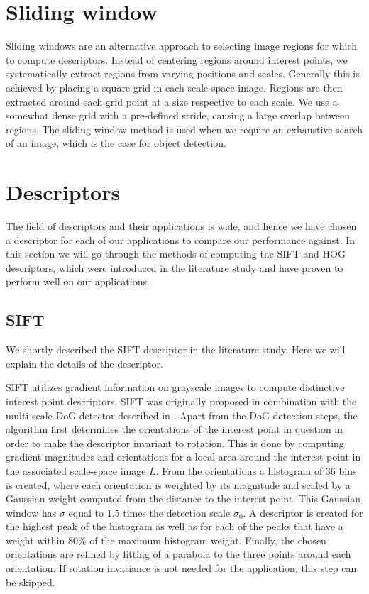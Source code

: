\documentclass[thesis.tex]{subfiles}
\begin{document}
\section{Sliding window}
\label{sec:slidingWindow}
%
Sliding windows are an alternative approach to selecting image regions for which to compute descriptors. Instead of centering regions around interest points, we systematically extract regions from varying positions and scales. Generally this is achieved by placing a square grid in each scale-space image. Regions are then extracted around each grid point at a size respective to each scale. We use a somewhat dense grid with a pre-defined stride, causing a large overlap between regions. The sliding window method is used when we require an exhaustive search of an image, which is the case for object detection.

\section{Descriptors}

The field of descriptors and their applications is wide, and hence we have chosen a descriptor for each of our applications to compare our performance against. In this section we will go through the methods of computing the SIFT and HOG descriptors, which were introduced in the literature study and have proven to perform well on our applications.

\subsection{SIFT}

We shortly described the SIFT descriptor in the literature study. Here we will explain the details of the descriptor.

SIFT utilizes gradient information on grayscale images to compute distinctive interest point descriptors. SIFT was originally proposed in combination with the multi-scale DoG detector described in . Apart from the DoG detection steps, the algorithm first determines the orientations of the interest point in question in order to make the descriptor invariant to rotation. This is done by computing gradient magnitudes and orientations for a local area around the interest point in the associated scale-space image $L$. From the orientations a histogram of 36 bins is created, where each orientation is weighted by its magnitude and scaled by a Gaussian weight computed from the distance to the interest point. This Gaussian window has $\sigma$ equal to $1.5$ times the detection scale $\sigma_0$. A descriptor is created for the highest peak of the histogram as well as for each of the peaks that have a weight within 80\% of the maximum histogram weight. Finally, the chosen orientations are refined by fitting of a parabola to the three points around each orientation. If rotation invariance is not needed for the application, this step can be skipped.
\end{document}
